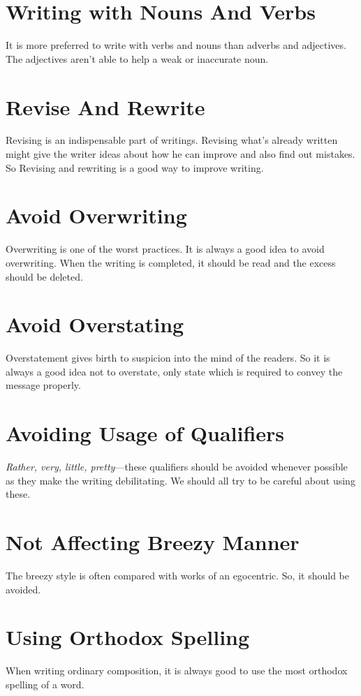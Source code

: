 \documentclass[12pt]{report}
\begin{document}
\section{Writing with Nouns And Verbs}
It is more preferred to write with verbs and nouns than adverbs and adjectives. The adjectives aren't able to help a weak or inaccurate noun.


\section{Revise And Rewrite}
Revising is an indispensable part of writings. Revising what's already written might give the writer ideas about how he can improve and also find out mistakes. So Revising and rewriting is a good way to improve writing.


\section{Avoid Overwriting}
Overwriting is one of the worst practices. It is always a good idea to avoid overwriting. When the writing is completed, it should be read and the excess should be deleted.


\section{Avoid Overstating}
Overstatement gives birth to suspicion into the mind of the readers. So it is always a good idea not to overstate, only state which is required to convey the message properly.


\section{Avoiding Usage of Qualifiers}
\textit{Rather, very, little, pretty}---these qualifiers should be avoided whenever possible as they make the writing debilitating. We should all try to be careful about using these.


\section{Not Affecting Breezy Manner}
The breezy style is often compared with works of an egocentric. So, it should be avoided.


\section{Using Orthodox Spelling}
When writing ordinary composition, it is always good to use the most orthodox spelling of a word.
\end{document}
